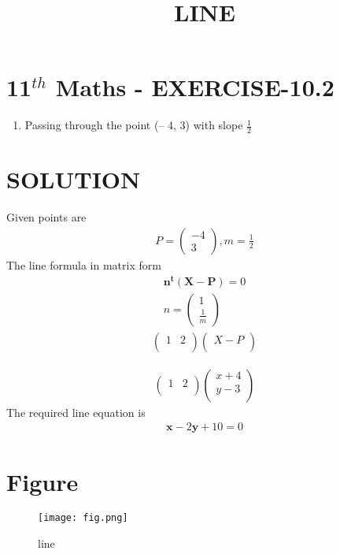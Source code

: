 \documentclass[12pt]{article}
\newcommand{\myvec}[1]{\ensuremath{\begin{pmatrix}#1\end{pmatrix}}}
\let\vec\mathbf
\begin{document}
\begin{center}
\title{\textbf{LINE}}
\date{\vspace{-5ex}} %
\maketitle
\end{center}

\section{11$^{th}$ Maths - EXERCISE-10.2}
\begin{enumerate}
\item Passing through the point (– 4, 3) with slope $\frac{1}{2}$
\end{enumerate}
\section{SOLUTION}
Given points are 
\begin{align}
P=\myvec{-4\\ 3},
m=\frac{1}{2}
\end{align}
The line formula in matrix form
\begin{align}
\vec{n^t\vec{(X-P)}}=0\\
n=\myvec{1\\ \frac{1}{m}}
\end{align}
\begin{align}
\begin{pmatrix}
    1 &2\\
\end{pmatrix}\begin{pmatrix}
    X-P\\
\end{pmatrix}
\end{align}

\begin{align}
 \begin{pmatrix}
    1 & 2\\
\end{pmatrix}\begin{pmatrix}
    x+4\\
    y-3\\
\end{pmatrix}
\end{align}
The required line equation is 
\begin{align}
 \vec{x}-2\vec{y}+10=0
\end{align} 
\section{Figure}
\begin{figure}[h]
\texttt{[image: fig.png]}
\caption{line}
		\label{fig:Figure}
\end{figure}
\end{document}
